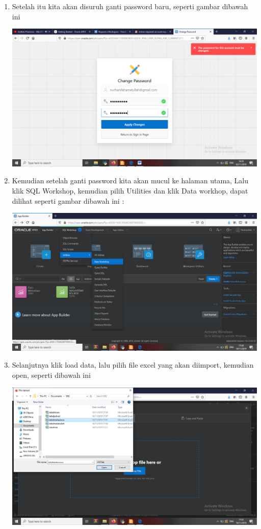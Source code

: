 \begin{enumerate}
	\item Setelah itu kita akan disuruh ganti password baru, seperti gambar dibawah ini
	\begin{center}
    \includegraphics[scale=0.2]{Apex/8.png}
    \end{center}
	
	\item Kemudian setelah ganti password kita akan mucul ke halaman utama, Lalu klik SQL Workshop, kemudian pilih Utilities dan klik Data workhop, dapat dilihat seperti gambar dibawah ini :
	\begin{center}
    \includegraphics[scale=0.2]{Apex/48.png}
    \end{center}
	
	\item Selanjutnya klik load data, lalu pilih file excel yang akan diimport, kemudian open, seperti dibawah ini
	\begin{center}
    \includegraphics[scale=0.2]{Apex/49.png}
    \end{center}
    

\end{enumerate}
